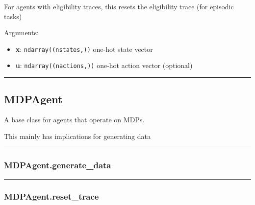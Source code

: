 For agents with eligibility traces, this resets the eligibility trace
(for episodic tasks)

Arguments:

\begin{itemize}
\tightlist
\item
  \textbf{x}: \texttt{ndarray((nstates,))} one-hot state vector
\item
  \textbf{u}: \texttt{ndarray((nactions,))} one-hot action vector
  (optional)
\end{itemize}

\begin{center}\rule{0.5\linewidth}{\linethickness}\end{center}

\hypertarget{mdpagent}{%
\subsection{MDPAgent}\label{mdpagent}}

\begin{Shaded}
\begin{Highlighting}[]
\end{Highlighting}
\end{Shaded}

A base class for agents that operate on MDPs.

This mainly has implications for generating data

\begin{center}\rule{0.5\linewidth}{\linethickness}\end{center}

\hypertarget{mdpagent.generate_data}{%
\subsubsection{MDPAgent.generate\_data}\label{mdpagent.generate_data}}

\begin{Shaded}
\begin{Highlighting}[]
\end{Highlighting}
\end{Shaded}

\begin{center}\rule{0.5\linewidth}{\linethickness}\end{center}

\hypertarget{mdpagent.reset_trace}{%
\subsubsection{MDPAgent.reset\_trace}\label{mdpagent.reset_trace}}

